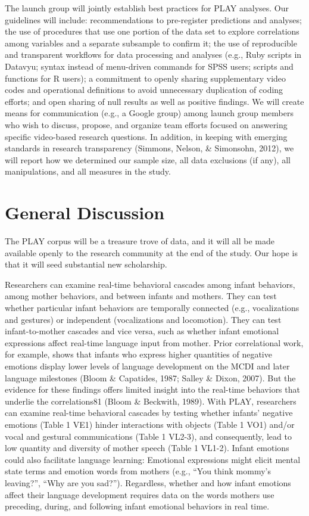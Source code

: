 \documentclass[english,man]{apa6}
\theoremstyle{definition}
\theoremstyle{definition}
\theoremstyle{definition}
\theoremstyle{remark}
\begin{document}
The launch group will jointly establish best practices for PLAY
analyses. Our guidelines will include: recommendations to pre-register
predictions and analyses; the use of procedures that use one portion of
the data set to explore correlations among variables and a separate
subsample to confirm it; the use of reproducible and transparent
workflows for data processing and analyses (e.g., Ruby scripts in
Datavyu; syntax instead of menu-driven commands for SPSS users; scripts
and functions for R users); a commitment to openly sharing supplementary
video codes and operational definitions to avoid unnecessary duplication
of coding efforts; and open sharing of null results as well as positive
findings. We will create means for communication (e.g., a Google group)
among launch group members who wish to discuss, propose, and organize
team efforts focused on answering specific video-based research
questions. In addition, in keeping with emerging standards in research
transparency (Simmons, Nelson, \& Simonsohn, 2012), we will report how
we determined our sample size, all data exclusions (if any), all
manipulations, and all measures in the study.

\section{General Discussion}\label{general-discussion}

The PLAY corpus will be a treasure trove of data, and it will all be
made available openly to the research community at the end of the study.
Our hope is that it will seed substantial new scholarship.

Researchers can examine real-time behavioral cascades among infant
behaviors, among mother behaviors, and between infants and mothers. They
can test whether particular infant behaviors are temporally connected
(e.g., vocalizations and gestures) or independent (vocalizations and
locomotion). They can test infant-to-mother cascades and vice versa,
such as whether infant emotional expressions affect real-time language
input from mother. Prior correlational work, for example, shows that
infants who express higher quantities of negative emotions display lower
levels of language development on the MCDI and later language milestones
(Bloom \& Capatides, 1987; Salley \& Dixon, 2007). But the evidence for
these findings offers limited insight into the real-time behaviors that
underlie the correlations81 (Bloom \& Beckwith, 1989). With PLAY,
researchers can examine real-time behavioral cascades by testing whether
infants' negative emotions (Table 1 VE1) hinder interactions with
objects (Table 1 VO1) and/or vocal and gestural communications (Table 1
VL2-3), and consequently, lead to low quantity and diversity of mother
speech (Table 1 VL1-2). Infant emotions could also facilitate language
learning: Emotional expressions might elicit mental state terms and
emotion words from mothers (e.g., \enquote{You think mommy's leaving?},
\enquote{Why are you sad?}). Regardless, whether and how infant emotions
affect their language development requires data on the words mothers use
preceding, during, and following infant emotional behaviors in real
time.
\end{document}
